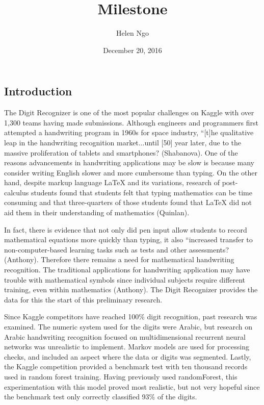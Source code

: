 \documentclass[a4paper]{article}
\title{Milestone}
\author{Helen Ngo}
\date{December 20, 2016}
\begin{document}
\lstset{language=Python,basicstyle=\ttfamily\footnotesize}

\maketitle

\begin{doublespace}

\section{Introduction}
The Digit Recognizer is one of the most popular challenges on Kaggle with over 1,300 teams having made submissions. Although engineers and programmers first attempted a handwriting program in 1960s for space industry, ``[t]he qualitative leap in the handwriting recognition market...until [50] year later, due to the massive proliferation of tablets and smartphones? (Shabanova). One of the reasons advancements in handwriting applications may be slow is because many consider writing English slower and more cumbersome than typing. On the other hand, despite markup language LaTeX and its variations, research of post-calculus students found that students felt that typing mathematics can be time consuming and that three-quarters of those students found that LaTeX did not aid them in their understanding of mathematics (Quinlan).

In fact, there is evidence that not only did pen input allow students to record mathematical equations more quickly than typing, it also ``increased transfer to non-computer-based learning tasks such as tests and other assessments? (Anthony). Therefore there remains a need for mathematical handwriting recognition. The traditional applications for handwriting application may have trouble with mathematical symbols since individual subjects require different training, even within mathematics (Anthony). The Digit Recognizer provides the data for this the start of this preliminary research.

Since Kaggle competitors have reached 100\% digit recognition, past research was examined. The numeric system used for the digits were Arabic, but research on Arabic handwriting recognition focused on multidimensional recurrent neural networks was unrealistic to implement. Markov models are used for processing checks, and included an aspect where the data or digits was segmented. Lastly, the Kaggle competition provided a benchmark test with ten thousand records used in random forest training. Having previously used randomForest, this experimentation with this model proved most realistic, but not very hopeful since the benchmark test only correctly classified 93\% of the digits.


\end{doublespace}
\end{document}
